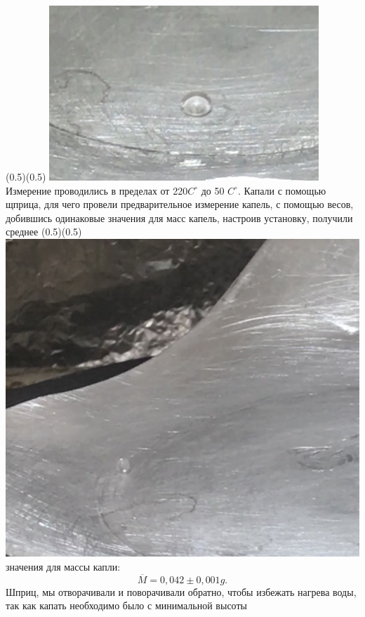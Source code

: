 \begin{frame}{}
\sidefig (0.5\linewidth)(0.5\linewidth)
{\includegraphics[scale=0.35]{5F8D7E02-0952-4090-83E1-37FAFF303F95_4_5005_c.jpeg}}{\vspace{0.10cm}Измерение проводились в пределах от 220\(C^{\circ}\) до 50 \(C^{\circ}\). Капали с помощью щприца, для чего провели предварительное измерение капель, с помощью весов, добившись одинаковые значения для масс капель, настроив установку, получили среднее}
\sidefig (0.5\linewidth)(0.5\linewidth)
{\includegraphics[scale=0.18]{A82B7535-E316-43B4-BE76-A6D4F11E907F_1_201_a.jpeg}}{значения для массы капли:\\
\[\overline{M} = 0,042 \pm 0,001 g. \]
Шприц, мы отворачивали и поворачивали обратно, чтобы избежать нагрева воды, так как капать необходимо было с минимальной высоты}
\end{frame}